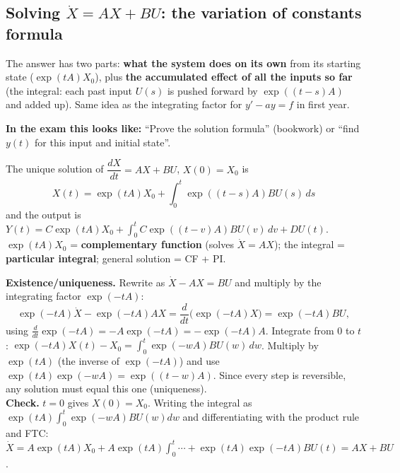 \subsection{Solving \texorpdfstring{$\dot X=AX+BU$}{dX/dt = AX+BU}: the variation of constants formula \texorpdfstring{}{}}\label{sec:solution}\label{ss:2-7}
\begin{plainbox}
The answer has two parts: \textbf{what the system does on its own} from its starting state ($\exp(tA)X_0$), plus
\textbf{the accumulated effect of all the inputs so far} (the integral: each past input $U(s)$ is pushed forward by $\exp((t-s)A)$ and added up).
Same idea as the integrating factor for $y'-ay=f$ in first year.
\par\smallskip\textbf{In the exam this looks like:} ``Prove the solution formula'' (bookwork) or ``find $y(t)$ for this input and initial state''.
\end{plainbox}
\begin{thmbox}[title={Theorem 0.17 and Corollary 0.18}]
The unique solution of $\dfrac{dX}{dt}=AX+BU$, $X(0)=X_0$ is
\[\boxed{X(t)=\exp(tA)X_0+\int_0^t\exp((t-s)A)BU(s)\,ds}\]
and the output is $Y(t)=C\exp(tA)X_0+\displaystyle\int_0^tC\exp((t-v)A)BU(v)\,dv+DU(t)$.\\
$\exp(tA)X_0$ = \textbf{complementary function} (solves $\dot X=AX$); the integral = \textbf{particular integral}; general solution = CF + PI.
\end{thmbox}
\begin{proofbox}[title={Proof of Theorem 0.17 (integrating factor)}]
\textbf{Existence/uniqueness.} Rewrite as $\dot X-AX=BU$ and multiply by the integrating factor $\exp(-tA)$:
\[\exp(-tA)\dot X-\exp(-tA)AX=\frac{d}{dt}\big(\exp(-tA)X\big)=\exp(-tA)BU,\]
using $\frac{d}{dt}\exp(-tA)=-A\exp(-tA)=-\exp(-tA)A$. Integrate from $0$ to $t$:
$\exp(-tA)X(t)-X_0=\int_0^t\exp(-wA)BU(w)\,dw$. Multiply by $\exp(tA)$ (the inverse of $\exp(-tA)$) and use $\exp(tA)\exp(-wA)=\exp((t-w)A)$.
Since every step is reversible, any solution must equal this one (uniqueness).\\
\textbf{Check.} $t=0$ gives $X(0)=X_0$. Writing the integral as $\exp(tA)\int_0^t\exp(-wA)BU(w)dw$ and differentiating with the product rule and FTC:
$\dot X=A\exp(tA)X_0+A\exp(tA)\int_0^t\cdots+\exp(tA)\exp(-tA)BU(t)=AX+BU$.
\end{proofbox}

